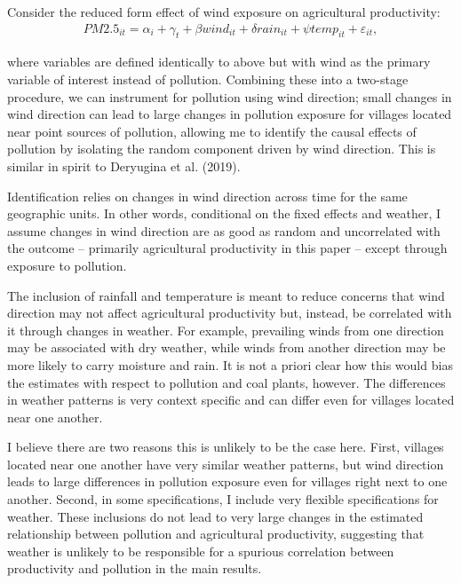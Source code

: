 \documentclass[
]{article}
\begin{document}
Consider the reduced form effect of wind exposure on agricultural productivity:
\begin{gather} PM2.5_{it} = \alpha_{i} + \gamma_{t} + \beta wind_{it} + \delta rain_{it} + \psi temp_{it} + \varepsilon_{it}, \end{gather}

where variables are defined identically to above but with wind as the primary variable of interest instead of pollution. Combining these into a two-stage procedure, we can instrument for pollution using wind direction; small changes in wind direction can lead to large changes in pollution exposure for villages located near point sources of pollution, allowing me to identify the causal effects of pollution by isolating the random component driven by wind direction. This is similar in spirit to Deryugina et al. (2019).

Identification relies on changes in wind direction across time for the same geographic units. In other words, conditional on the fixed effects and weather, I assume changes in wind direction are as good as random and uncorrelated with the outcome -- primarily agricultural productivity in this paper -- except through exposure to pollution.

The inclusion of rainfall and temperature is meant to reduce concerns that wind direction may not affect agricultural productivity but, instead, be correlated with it through changes in weather. For example, prevailing winds from one direction may be associated with dry weather, while winds from another direction may be more likely to carry moisture and rain. It is not a priori clear how this would bias the estimates with respect to pollution and coal plants, however. The differences in weather patterns is very context specific and can differ even for villages located near one another.

I believe there are two reasons this is unlikely to be the case here. First, villages located near one another have very similar weather patterns, but wind direction leads to large differences in pollution exposure even for villages right next to one another. Second, in some specifications, I include very flexible specifications for weather. These inclusions do not lead to very large changes in the estimated relationship between pollution and agricultural productivity, suggesting that weather is unlikely to be responsible for a spurious correlation between productivity and pollution in the main results.
\end{document}

